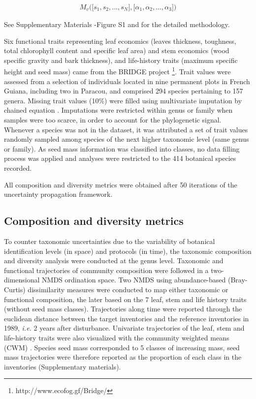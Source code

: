 \documentclass[fleqn,10pt]{ArtEcoFoG} %
\begin{document}
\begin{align}
M_v\Big(\big[s_1, s_2,..., s_N\big],\big[\alpha_1, \alpha_2,..., \alpha_3\big]\Big) \nonumber
\end{align}

See Supplementary Materials -Figure S1 and \citet{Aubry-Kientz2013} for
the detailed methodology.

Six functional traits representing leaf economics (leaves thickness,
toughness, total chlorophyll content and specific leaf area) and stem
economics (wood specific gravity and bark thickness), and life-history
traits (maximum specific height and seed mass) came from the BRIDGE
project \footnote{http://www.ecofog.gf/Bridge/}. Trait values were
assessed from a selection of individuals located in nine permanent plots
in French Guiana, including two in Paracou, and comprised 294 species
pertaining to 157 genera. Missing trait values (10\%) were filled using
multivariate imputation by chained equation \citep{Mice2011}.
Imputations were restricted within genus or family when samples were too
scarce, in order to account for the phylogenetic signal. Whenever a
species was not in the dataset, it was attributed a set of trait values
randomly sampled among species of the next higher taxonomic level (same
genus or family). As seed mass information was classified into classes,
no data filling process was applied and analyses were restricted to the
414 botanical species recorded.

All composition and diversity metrics were obtained after 50 iterations
of the uncertainty propagation framework.

\subsection{Composition and diversity
metrics}\label{composition-and-diversity-metrics}

To counter taxonomic uncertainties due to the variability of botanical
identification levels (in space) and protocols (in time), the taxonomic
composition and diversity analysis were conducted at the genus level.
Taxonomic and functional trajectories of community composition were
followed in a two-dimensional NMDS ordination space. Two NMDS using
abundance-based (Bray-Curtis) dissimilarity measures were conducted to
map either taxonomic or functional composition, the later based on the 7
leaf, stem and life history traits (without seed mass classes).
Trajectories along time were reported through the euclidean distance
between the target inventories and the reference inventories in 1989,
\emph{i.e.} 2 years after disturbance. Univariate trajectories of the
leaf, stem and life-history traits were also visualized with the
community weighted means (CWM) \citep{Diaz2007}. Species seed mass
corresponded to 5 classes of increasing mass, seed mass trajectories
were therefore reported as the proportion of each class in the
inventories (Supplementary materials).
\end{document}
